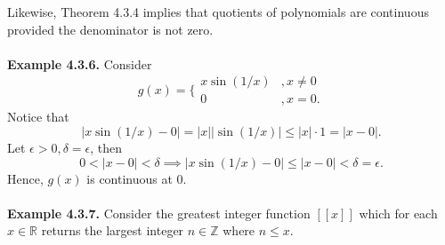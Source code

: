 \documentclass{article}
\begin{document}
            Likewise, Theorem 4.3.4 implies that quotients of polynomials are continuous provided the denominator is not zero.
            \\ \\
            \textbf{Example 4.3.6.} Consider
            \begin{equation*}
                g(x) = \bigg\{ \begin{matrix} x\sin(1/x) &, x \neq 0 \\ 0 &, x=0. \end{matrix}
            \end{equation*}
            Notice that
            \begin{equation*}
                |x\sin(1/x)-0| = |x||\sin(1/x)| \leq |x| \cdot 1 = |x-0|.
            \end{equation*}
            Let $\epsilon>0, \delta=\epsilon$, then
            \begin{equation*}
                0<|x-0|<\delta \implies |x\sin(1/x)-0| \leq |x-0| < \delta = \epsilon.
            \end{equation*}
            Hence, $g(x)$ is continuous at 0.
            \\ \\
            \textbf{Example 4.3.7.} Consider the greatest integer function $[[x]]$ which for each $x \in \mathbb{R}$ returns the largest integer $n \in \mathbb{Z}$ where $n \leq x$. 
            
\end{document}
